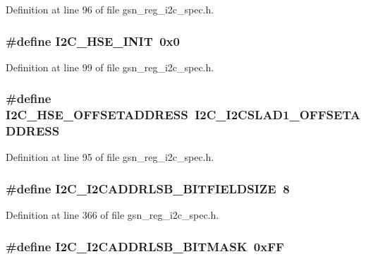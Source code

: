Definition at line 96 of file gsn\_\-reg\_\-i2c\_\-spec.h.

\hypertarget{a00558_a5ae08d0372c0890677613c3b3ac5e213}{
\subsubsection[{I2C\_\-HSE\_\-INIT}]{\setlength{\rightskip}{0pt plus 5cm}\#define I2C\_\-HSE\_\-INIT~0x0}}
\label{a00558_a5ae08d0372c0890677613c3b3ac5e213}


Definition at line 99 of file gsn\_\-reg\_\-i2c\_\-spec.h.

\hypertarget{a00558_abb6821dbb196351a15b597d25d0def0d}{
\subsubsection[{I2C\_\-HSE\_\-OFFSETADDRESS}]{\setlength{\rightskip}{0pt plus 5cm}\#define I2C\_\-HSE\_\-OFFSETADDRESS~I2C\_\-I2CSLAD1\_\-OFFSETADDRESS}}
\label{a00558_abb6821dbb196351a15b597d25d0def0d}


Definition at line 95 of file gsn\_\-reg\_\-i2c\_\-spec.h.

\hypertarget{a00558_a915cabe3cabf53d48c266b4a51ecae6c}{
\subsubsection[{I2C\_\-I2CADDRLSB\_\-BITFIELDSIZE}]{\setlength{\rightskip}{0pt plus 5cm}\#define I2C\_\-I2CADDRLSB\_\-BITFIELDSIZE~8}}
\label{a00558_a915cabe3cabf53d48c266b4a51ecae6c}


Definition at line 366 of file gsn\_\-reg\_\-i2c\_\-spec.h.

\hypertarget{a00558_aa6d87c8f028825d61b900c0173e3258f}{
\subsubsection[{I2C\_\-I2CADDRLSB\_\-BITMASK}]{\setlength{\rightskip}{0pt plus 5cm}\#define I2C\_\-I2CADDRLSB\_\-BITMASK~0xFF}}
\label{a00558_aa6d87c8f028825d61b900c0173e3258f}


